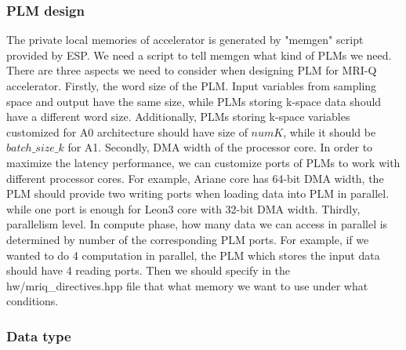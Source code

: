 \documentclass{sig-alternate}
\begin{document}
\subsubsection{PLM design}
The private local memories of accelerator is generated by "memgen" script provided by ESP. We need a script to tell memgen what kind of PLMs we need. There are three aspects we need to consider when designing PLM for MRI-Q accelerator. Firstly, the word size of the PLM. Input variables from sampling space and output have the same size, while PLMs storing k-space data should have a different word size. Additionally, PLMs storing k-space variables customized for A0 architecture should have size of $numK$, while it should be $batch\_size\_k$ for A1. Secondly, DMA width of the processor core. In order to maximize the latency performance, we can customize ports of PLMs to work with different processor cores. For example, Ariane core has 64-bit DMA width, the PLM should provide two writing ports when loading data into PLM in parallel. while one port is enough for Leon3 core with 32-bit DMA width. Thirdly, parallelism level. In compute phase, how many data we can access in parallel is determined by number of the corresponding PLM ports. For example, if we wanted to do 4 computation in parallel, the PLM which stores the input data should have 4 reading ports. Then we should specify in the hw/mriq\_directives.hpp file that what memory we want to use under what conditions. 


\subsubsection{Data type}
\end{document}
